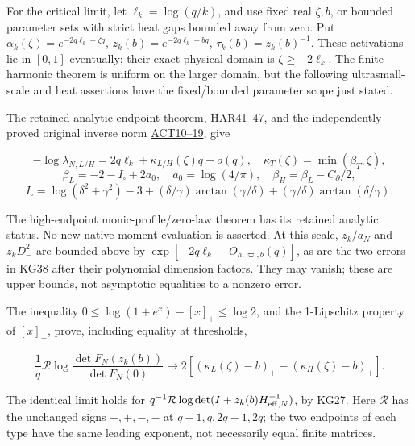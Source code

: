 \documentclass[11pt]{article}
\begin{document}
For the critical limit, let \(\ell_k=\log(q/k)\), and use fixed real \(\zeta,b\), or bounded parameter sets with strict heat gaps bounded away from zero. Put \(\alpha_k(\zeta)=e^{-2q\ell_k-\zeta q}\), \(z_k(b)=e^{-2q\ell_k-bq}\), \(\tau_k(b)=z_k(b)^{-1}\). These activations lie in \([0,1]\) eventually; their exact physical domain is \(\zeta\ge-2\ell_k\). The finite harmonic theorem is uniform on the larger domain, but the following ultrasmall-scale and heat assertions have the fixed/bounded parameter scope just stated.

The retained analytic endpoint theorem, \href{https://github.com/KokunoYumeto/zeta-function-research-reader/blob/360d3c1d798da434966d35f7e407fc59c14f234b/workbenches/splitzero-tandem/continuations/20260921-critical-inverse-activation/HARMONIC_PROOFS.md\#L461}{HAR41--47}, and the independently proved original inverse norm \href{https://github.com/KokunoYumeto/zeta-function-research-reader/blob/360d3c1d798da434966d35f7e407fc59c14f234b/workbenches/splitzero-tandem/continuations/20260921-critical-inverse-activation/ACTION_PROOFS.md\#L152}{ACT10--19}, give

\[
-\log\lambda_{N,L/H}=2q\ell_k+\kappa_{L/H}(\zeta)q+o(q),\quad
\kappa_T(\zeta)=\min(\beta_T,\zeta),
\] \[
\beta_L=-2-I_\square+2a_0,\quad a_0=\log(4/\pi),\quad
\beta_H=\beta_L-C_\partial/2,
\] \[
I_\square=\log(\delta^2+\gamma^2)-3
 +(\delta/\gamma)\arctan(\gamma/\delta)+(\gamma/\delta)\arctan(\delta/\gamma).
\tag{KG39}
\]

The high-endpoint monic-profile/zero-law theorem has its retained analytic status. No new native moment evaluation is asserted. At this scale, \(z_k/a_N\) and \(z_kD_-^2\) are bounded above by \(\exp[-2q\ell_k+O_{h,\varpi,b}(q)]\), as are the two errors in KG38 after their polynomial dimension factors. They may vanish; these are upper bounds, not asymptotic equalities to a nonzero error.

The inequality \(0\le\log(1+e^x)-[x]_+\le\log2\), and the 1-Lipschitz property of \([x]_+\), prove, including equality at thresholds,

\[
\boxed{\frac1q\mathcal R\log\frac{\det F_N(z_k(b))}{\det F_N(0)}
\longrightarrow2[(\kappa_L(\zeta)-b)_+-(\kappa_H(\zeta)-b)_+].}
\tag{KG40}
\]

The identical limit holds for \(q^{-1}\mathcal R\log\det(I+z_k(b)H_{{\rm eff},N}^{-1})\), by KG27. Here \(\mathcal R\) has the unchanged signs \(+,+,-,-\) at \(q-1,q,2q-1,2q\); the two endpoints of each type have the same leading exponent, not necessarily equal finite matrices.
\end{document}
